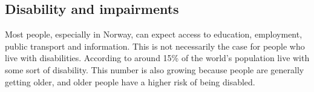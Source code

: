 



\subsection{Disability and impairments}
Most people, especially in Norway, can expect access to education, employment, public transport and information. This is not necessarily the case for people who live with disabilities. According to \textcite{world_health_organization_world_2011} around 15\% of the world's population live with some sort of disability. This number is also growing because people are generally getting older, and older people have a higher risk of being disabled. 

